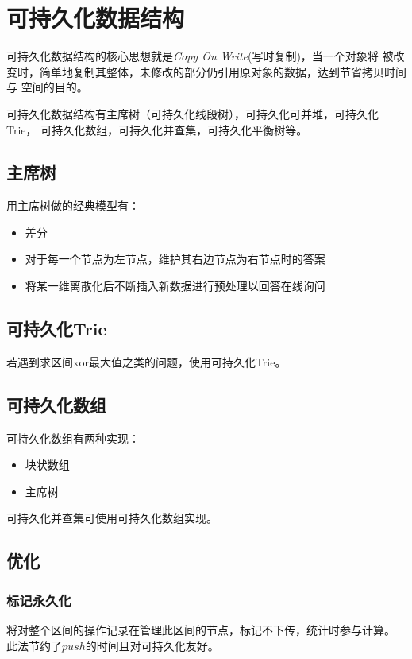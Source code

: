\section{可持久化数据结构}
可持久化数据结构的核心思想就是\emph{Copy On Write}(写时复制)，当一个对象将
被改变时，简单地复制其整体，未修改的部分仍引用原对象的数据，达到节省拷贝时间与
空间的目的。

可持久化数据结构有主席树（可持久化线段树），可持久化可并堆，可持久化Trie，
可持久化数组，可持久化并查集，可持久化平衡树等。
\subsection{主席树}
用主席树做的经典模型有：
\begin{itemize}
    \item 差分
    \item 对于每一个节点为左节点，维护其右边节点为右节点时的答案
    \item 将某一维离散化后不断插入新数据进行预处理以回答在线询问
\end{itemize}
\subsection{可持久化Trie}
若遇到求区间xor最大值之类的问题，使用可持久化Trie。
\subsection{可持久化数组}
可持久化数组有两种实现：
\begin{itemize}
    \item 块状数组
    \item 主席树
\end{itemize}
可持久化并查集可使用可持久化数组实现。
\subsection{优化}
\subsubsection{标记永久化}
将对整个区间的操作记录在管理此区间的节点，标记不下传，统计时参与计算。
此法节约了$push$的时间且对可持久化友好。
